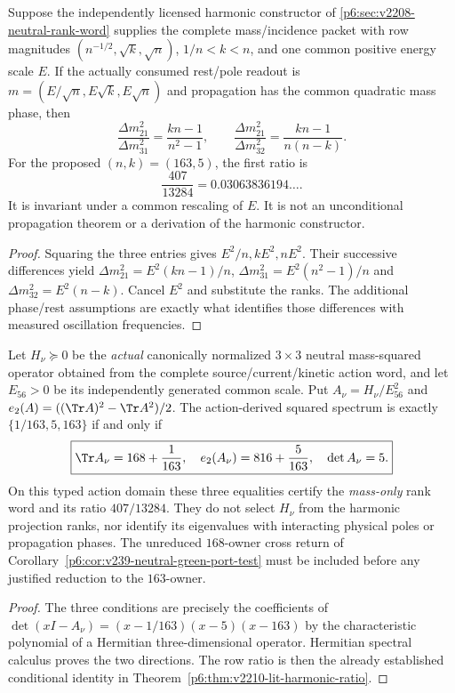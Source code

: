 \documentclass[12pt,a4paper]{article}
\begin{document}
\begin{theorem}
\label{p6:thm:v2210-lit-harmonic-ratio}
Suppose the independently licensed harmonic constructor of
\ref{p6:sec:v2208-neutral-rank-word} supplies the complete mass/incidence
packet with row magnitudes
\((n^{-1/2},\sqrt k,\sqrt n)\), \(1/n<k<n\), and one common
positive energy scale \(E\).  If the actually consumed rest/pole readout is
\(m=(E/\sqrt n,E\sqrt k,E\sqrt n)\) and propagation has the common
quadratic mass phase, then
\[
 \boxed{\frac{\Delta m_{21}^2}{\Delta m_{31}^2}
 =\frac{kn-1}{n^2-1},\qquad
 \frac{\Delta m_{21}^2}{\Delta m_{32}^2}
 =\frac{kn-1}{n(n-k)}.}
\]
For the proposed \((n,k)=(163,5)\), the first ratio is
\[
 \boxed{\frac{407}{13284}=0.03063836194\ldots.}
\]
It is invariant under a common rescaling of \(E\).  It is not an
unconditional propagation theorem or a derivation of the harmonic
constructor.
\end{theorem}
\begin{proof}
Squaring the three entries gives
\(E^2/n,kE^2,nE^2\).  Their successive differences yield
\(\Delta m_{21}^2=E^2(kn-1)/n\),
\(\Delta m_{31}^2=E^2(n^2-1)/n\) and
\(\Delta m_{32}^2=E^2(n-k)\).  Cancel \(E^2\) and substitute the ranks.
The additional phase/rest assumptions are exactly what identifies those
differences with measured oscillation frequencies.
\end{proof}

\begin{proposition}
\label{p6:prop:v245-neutral-three-invariant-action-test}
Let $H_\nu\succeq0$ be the \emph{actual} canonically normalized
$3\times3$ neutral mass-squared operator obtained from the complete
source/current/kinetic action word, and let $E_{56}>0$ be its
independently generated common scale. Put $A_\nu=H_\nu/E_{56}^2$
and $e_2(A)=((\Tr A)^2-\Tr A^2)/2$. The action-derived squared
spectrum is exactly $\{1/163,5,163\}$ if and only if
\[
 \boxed{\Tr A_\nu=168+\frac1{163},\quad
 e_2(A_\nu)=816+\frac5{163},\quad
 \det A_\nu=5.}
\]
On this typed action domain these three equalities certify the
\emph{mass-only} rank word and its ratio $407/13284$. They do
not select $H_\nu$ from the harmonic projection ranks, nor identify
its eigenvalues with interacting physical poles or propagation phases.
The unreduced $168$-owner cross return of
Corollary~\ref{p6:cor:v239-neutral-green-port-test} must be included
before any justified reduction to the $163$-owner.
\end{proposition}
\begin{proof}
The three conditions are precisely the coefficients of
$\det(xI-A_\nu)=(x-1/163)(x-5)(x-163)$ by the
characteristic polynomial of a Hermitian three-dimensional operator.
Hermitian spectral calculus proves the two directions. The row ratio
is then the already established conditional identity in
Theorem~\ref{p6:thm:v2210-lit-harmonic-ratio}.
\end{proof}
\end{document}
